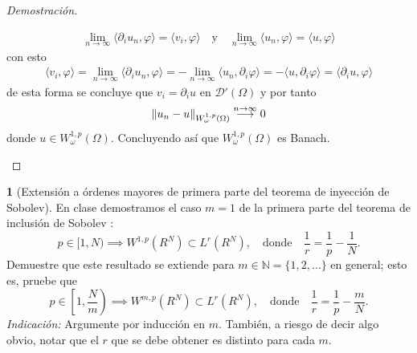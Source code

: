 \documentclass[10pt,a4paper]{report}
\renewcommand{\natural}{\mathbb{N}}
\newcommand{\norm}[2][y]{{\if#1y\left\fi\lVert#2\if#1y\right\fi\rVert}}
\theoremstyle{definition}
\newtheorem{problem}{\color{azul}{Problema}}
\renewcommand{\theproblem}{\Alph{problem}}
\numberwithin{equation}{problem}
\providecommand{\norm}[1]{\left\lVert#1\right\rVert}
\begin{document}
\begin{proof}[\textcolor{rojo}{Demostración}]
\begin{enumerate}[label=\textbf{\theproblem.\arabic{*}.},ref=\theproblem.\arabic{*},parsep=1ex]
\begin{align*}
            	\lim_{n\to\infty}\langle \partial_{i}u_{n},\varphi \rangle = \langle v_{i},\varphi \rangle \quad \text{y} \quad \lim_{n\to\infty}\langle u_{n},\varphi \rangle = \langle u,\varphi \rangle
            \end{align*}
            con esto
            \begin{align*}
            	\langle v_{i},\varphi \rangle = \lim_{n\to\infty}\langle \partial_{i}u_{n},\varphi \rangle = -\lim_{n\to\infty}\langle u_{n},\partial_{i}\varphi \rangle = -\langle u,\partial_{i}\varphi \rangle = \langle \partial_{i}u,\varphi \rangle
            \end{align*}
            de esta forma se concluye que $v_{i} = \partial_{i}u$ en $\mathcal{D}'(\Omega)$ y por tanto 
            \begin{align*}
            	\norm{u_{n}-u}_{W^{1,p}_{\omega}(\Omega)}\overset{n\to \infty}{\longrightarrow} 0
            \end{align*}
            donde $u\in W_{\omega}^{1,p}(\Omega)$. Concluyendo así que $W_{\omega}^{1,p}(\Omega)$ es Banach.
    	\end{enumerate}
    \end{proof}
    \bigskip
    \begin{problem}[Extensión a órdenes mayores de primera parte del teorema de inyección de Sobolev]
    	En clase demostramos el caso $m = 1$ de la primera parte del teorema de inclusión de Sobolev \cite[Theorem~6.7(i)]{Tartar}:
    	\begin{equation*}
    		p \in [1, N) \implies W^{1,p}(R^N) \subset L^r(R^N),
    		\quad\text{donde}\quad \frac{1}{r} = \frac{1}{p} - \frac{1}{N}.
    	\end{equation*}
    	Demuestre que este resultado se extiende para $m \in \natural = \{1, 2, \dotsc \}$ en general; esto es, pruebe que
    	\begin{equation*}
    		p \in \left[1, {\textstyle \frac{N}{m}}\right) \implies W^{m,p}(R^N) \subset L^r(R^N),
    		\quad\text{donde}\quad \frac{1}{r} = \frac{1}{p} - \frac{m}{N}.
    	\end{equation*}
    	\emph{Indicación:} Argumente por inducción en $m$.
    	También, a riesgo de decir algo obvio, notar que el $r$ que se debe obtener es distinto para cada $m$.
    \end{problem}
\end{document}

